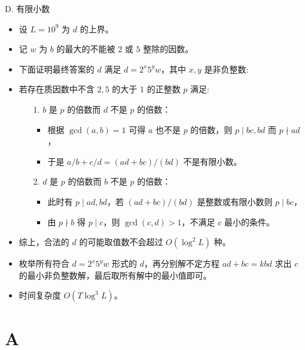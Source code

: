 \documentclass[9pt]{ctexbeamer}
\newcommand{\setParDis}{\setlength{\parskip}{6pt}}
\begin{document}
\begin{frame}
\setParDis

D. 有限小数

\begin{itemize}
	\item 设 $L = 10 ^ 9$ 为 $d$ 的上界。
	\item 记 $w$ 为 $b$ 的最大的不能被 $2$ 或 $5$ 整除的因数。
	\item 下面证明最终答案的 $d$ 满足 $d=2^x5^yw$，其中 $x,y$ 是非负整数:
	\item 若存在质因数中不含 $2,5$ 的大于 $1$ 的正整数 $p$ 满足:
		\begin{itemize}
			\item[1.] $b$ 是 $p$ 的倍数而 $d$ 不是 $p$ 的倍数：
				\begin{itemize}
					\item 根据 $\gcd(a,b)=1$ 可得 $a$ 也不是 $p$ 的倍数，则 $p \mid bc,bd$ 而 $p \nmid ad$，
					\item 于是 $a / b + c / d = (ad+bc) / (bd)$ 不是有限小数。
				\end{itemize}
			\item[2.] $d$ 是 $p$ 的倍数而 $b$ 不是 $p$ 的倍数：
				\begin{itemize}
					\item 此时有 $p \mid ad, bd$，若 $(ad+bc) / (bd)$ 是整数或有限小数则 $p \mid bc$，
					\item 由 $p \nmid b$ 得 $p \mid c$，则 $\gcd(c, d) > 1$，不满足 $c$ 最小的条件。
				\end{itemize}
		\end{itemize}
	\item 综上，合法的 $d$ 的可能取值数不会超过 $O(\log ^ 2 L)$ 种。
	\item 枚举所有符合 $d=2^x5^yw$ 形式的 $d$，再分别解不定方程 $ad+bc=kbd$ 求出 $c$ 的最小非负整数解，最后取所有解中的最小值即可。
	\item 时间复杂度 $O(T\log^3 L)$。
\end{itemize}

\end{frame}

\section{A}
\end{document}
